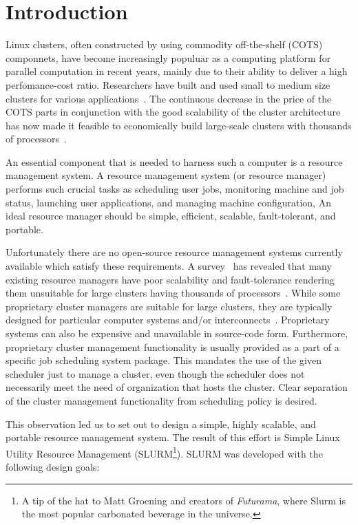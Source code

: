 \section{Introduction}
Linux clusters, often constructed by using commodity off-the-shelf (COTS) componnets,
have become increasingly populuar as a computing platform for parallel computation
in recent years, mainly due to their ability to deliver a high perfomance-cost ratio.
Researchers have built and used small to medium size clusters for various
applications~\cite{BeowulfWeb,LokiWeb}.
The continuous decrease in the price of the COTS parts in conjunction with
the good scalability of the cluster architecture has now made it feasible to economically
build large-scale clusters with thousands of processors~\cite{MCRWeb,PCRWeb}.

An essential component that is needed to harness such a computer is a
resource management system.
A resource management system (or resource manager) performs such crucial tasks as
scheduling user jobs, monitoring machine and job status, launching user applications, and
managing machine configuration,
An ideal resource manager should be simple, efficient, scalable, fault-tolerant,
and portable.

Unfortunately there are no open-source resource management systems currently available
which satisfy these requirements.
A survey~\cite{Jette02} has revealed that many existing resource managers have poor scalability and fault-tolerance rendering them unsuitable for large clusters having
thousands of processors~\cite{LoadLevelerWeb,LoadLevelerManual}.
While some proprietary cluster managers are suitable for large clusters,
they are typically designed for particular computer systems and/or
interconnects~\cite{RMS,LoadLevelerWeb,LoadLevelerManual}.
Proprietary systems can also be expensive and unavailable in source-code form.
Furthermore, proprietary cluster management functionality is usually provided as a
part of a specific job scheduling system package.
This mandates the use of the given scheduler just to manage a cluster,
even though the scheduler does not necessarily meet the need of organization that hosts the cluster.
Clear separation of the cluster management functionality from scheduling policy is desired.

This observation led us to set out to design a simple, highly scalable, and
portable resource management system.
The result of this effort is Simple Linux Utility Resource Management
(SLURM\footnote{A tip of the hat to Matt Groening and creators of {\em Futurama},
where Slurm is the most popular carbonated beverage in the universe.}).
SLURM was developed with the following design goals:

